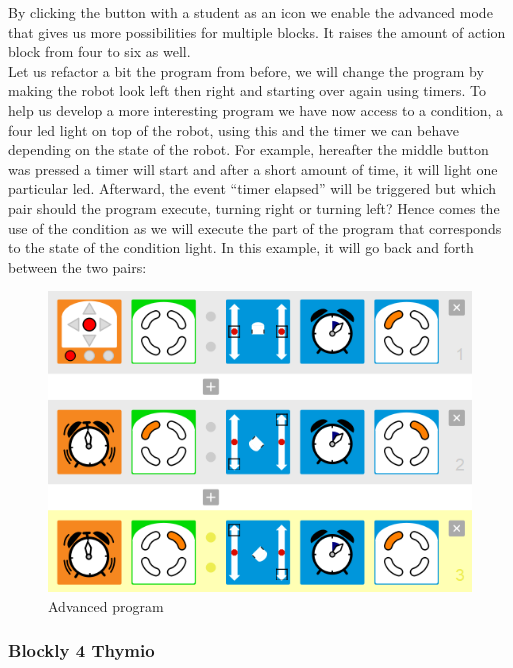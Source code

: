 \documentclass{scrartcl}
\begin{document}
By clicking the button with a student as an icon we enable the advanced mode that gives us more possibilities for multiple blocks. It raises the amount of action block from four to six as well. \\

Let us refactor a bit the program from before, we will change the program by making the robot look left then right and starting over again using timers. 
To help us develop a more interesting program we have now access to a condition, a four led light on top of the robot, using this and the timer we can behave depending on the state of the robot. 
For example, hereafter the middle button was pressed a timer will start and after a short amount of time, it will light one particular led. 
Afterward, the event “timer elapsed” will be triggered but which pair should the program execute, turning right or turning left? 
Hence comes the use of the condition as we will execute the part of the program that corresponds to the state of the condition light. 
In this example, it will go back and forth between the two pairs: \\
\begin{figure}
  \centering
  \includegraphics[scale=0.5]{./VPL/middlebtn_3E_adv}
  \caption{Advanced program}
  \label{fig:thymio_vpl_middlebtn_3e9a}
\end{figure}

\subsubsection{Blockly 4 Thymio}
\end{document}
